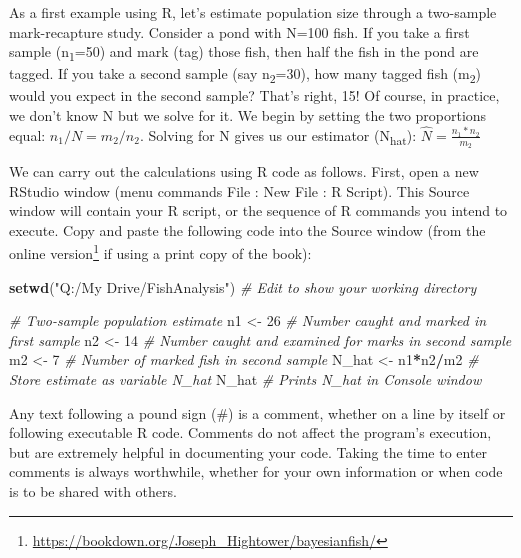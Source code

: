 \documentclass[
]{krantz}
\makeatletter
\newenvironment{Shaded}{\begin{snugshade}}{\end{snugshade}}
\newcommand{\CommentTok}[1]{\textcolor[rgb]{0.37,0.37,0.37}{\textit{#1}}}
\newcommand{\DecValTok}[1]{\textcolor[rgb]{0.06,0.06,0.06}{#1}}
\newcommand{\FunctionTok}[1]{\textcolor[rgb]{0.27,0.27,0.27}{\textbf{#1}}}
\newcommand{\NormalTok}[1]{#1}
\newcommand{\OtherTok}[1]{\textcolor[rgb]{0.37,0.37,0.37}{#1}}
\newcommand{\SpecialCharTok}[1]{\textcolor[rgb]{0.43,0.43,0.43}{\textbf{#1}}}
\newcommand{\StringTok}[1]{\textcolor[rgb]{0.5,0.5,0.5}{#1}}
\renewcommand{\href}[2]{#2\footnote{\url{#1}}}
\newenvironment{kframe}{%
\medskip{}
\setlength{\fboxsep}{.8em}
 \def\at@end@of@kframe{}%
 \ifinner\ifhmode%
  \def\at@end@of@kframe{\end{minipage}}%
  \begin{minipage}{\columnwidth}%
 \fi\fi%
 \def\FrameCommand##1{\hskip\@totalleftmargin \hskip-\fboxsep
 \colorbox{shadecolor}{##1}\hskip-\fboxsep
     \hskip-\linewidth \hskip-\@totalleftmargin \hskip\columnwidth}%
 \MakeFramed {\advance\hsize-\width
   \@totalleftmargin\z@ \linewidth\hsize
   \@setminipage}}%
 {\par\unskip\endMakeFramed%
 \at@end@of@kframe}
\renewenvironment{Shaded}{\begin{kframe}}{\end{kframe}}
\makeatother
\begin{document}
As a first example using R, let's estimate population size through a two-sample mark-recapture study. Consider a pond with N=100 fish. If you take a first sample (n\textsubscript{1}=50) and mark (tag) those fish, then half the fish in the pond are tagged. If you take a second sample (say n\textsubscript{2}=30), how many tagged fish (m\textsubscript{2}) would you expect in the second sample? That's right, 15! Of course, in practice, we don't know N but we solve for it. We begin by setting the two proportions equal: \(n_1/N=m_2/n_2\). Solving for N gives us our estimator (N\textsubscript{hat}): \(\hat{N} = \frac{n_1*n_2}{m_2}\)

We can carry out the calculations using R code as follows. First, open a new RStudio window (menu commands File : New File : R Script). This Source window will contain your R script, or the sequence of R commands you intend to execute. Copy and paste the following code into the Source window (from the online \href{https://bookdown.org/Joseph_Hightower/bayesianfish/}{version} if using a print copy of the book):

\begin{Shaded}
\begin{Highlighting}[]
\FunctionTok{setwd}\NormalTok{(}\StringTok{"Q:/My Drive/FishAnalysis"}\NormalTok{) }\CommentTok{\# Edit to show your working directory}

\CommentTok{\# Two{-}sample population estimate}
\NormalTok{n1 }\OtherTok{\textless{}{-}} \DecValTok{26} \CommentTok{\# Number caught and marked in first sample}
\NormalTok{n2 }\OtherTok{\textless{}{-}} \DecValTok{14} \CommentTok{\# Number caught and examined for marks in second sample}
\NormalTok{m2 }\OtherTok{\textless{}{-}} \DecValTok{7} \CommentTok{\# Number of marked fish in second sample}
\NormalTok{N\_hat }\OtherTok{\textless{}{-}}\NormalTok{ n1}\SpecialCharTok{*}\NormalTok{n2}\SpecialCharTok{/}\NormalTok{m2 }\CommentTok{\# Store estimate as variable N\_hat}
\NormalTok{N\_hat }\CommentTok{\# Prints N\_hat in Console window}
\end{Highlighting}
\end{Shaded}

Any text following a pound sign (\#) is a comment, whether on a line by itself or following executable R code. Comments do not affect the program's execution, but are extremely helpful in documenting your code. Taking the time to enter comments is always worthwhile, whether for your own information or when code is to be shared with others.
\end{document}

